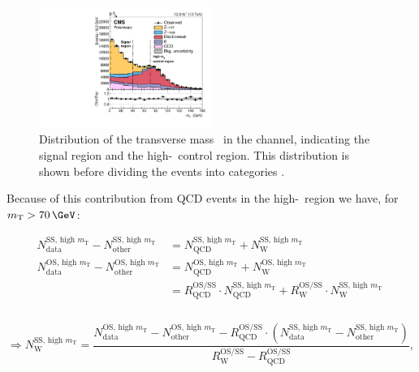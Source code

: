 \begin{figure}[h!]
\begin{center}
\includegraphics[width=0.5\textwidth]{./MSSM/Figures/CMS-PAS-HIG-16-037_Figure_002.pdf}
\end{center}
\caption[Distribution of the transverse mass \mT~in the \mutau channel, indicating the signal region and the high-\mT~control region.]{Distribution of the transverse mass \mT~in the \mutau channel, indicating
the signal region and the high-\mT~control region. This distribution is shown
before dividing the events into categories \cite{CMS-PAS-HIG-16-037}.}
\label{fig:mssm_bkgs_wjets_mutau_mt}
\end{figure}

Because of this contribution from QCD events in the high-\mT~region we
have, for $\mTm>70\,\GeV$:\\
\begin{minipage}{\textwidth}
\begin{equation*}
\begin{split}
N_{\text{data}}^{\text{SS, high } m_{\text{T}}} - N_{\text{other}}^{\text{SS,
 high } m_{\text{T}}} &=
N_{\text{QCD}}^{\text{SS, high } m_{\text{T}}} + N_{\text{W}}^{\text{SS, high } m_{\text{T}}}\\
N_{\text{data}}^{\text{OS, high } m_{\text{T}}} - N_{\text{other}}^{\text{OS,
 high } m_{\text{T}}}  &= N_{\text{QCD}}^{\text{OS, high } m_{\text{T}}} +
N_{\text{W}}^{\text{OS, high } m_{\text{T}}}\\
&= R_{\text{QCD}}^{\text{OS/SS}}\cdot N_{\text{QCD}}^{\text{SS, high } m_{\text{T}}} +
R_{\text{W}}^{\text{OS/SS}} \cdot N_{\text{W}}^{\text{SS, high } m_{\text{T}}} ~\\
\end{split}
\end{equation*}
~\vspace{-\baselineskip}
\begin{equation}\label{eqn:wjets_ss_norm}
\Rightarrow N_{\text{W}}^{\text{SS, high } m_{\text{T}}} = \frac{N_{\text{data}}^{\text{OS,
 high } m_{\text{T}}}  - N_{\text{other}}^{\text{OS, high } m_{\text{T}}}  -
R_{\text{QCD}}^{\text{OS/SS}}\cdot(N_{\text{data}}^{\text{SS, high } m_{\text{T}}}  -
N_{\text{other}}^{\text{SS, high } m_{\text{T}}} )}{R_{\text{W}}^{\text{OS/SS}} -
R_{\text{QCD}}^{\text{OS/SS}}},
\end{equation}
\end{minipage}

